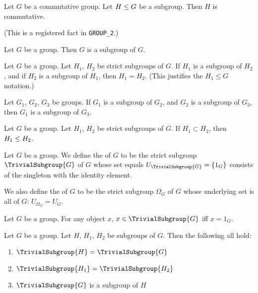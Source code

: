 \begin{theorem}
Let $G$ be a commutative group. Let $H\leq G$ be a subgroup.
Then $H$ is commutative.
\end{theorem}
(This is a registered fact in \texttt{GROUP\_2}.)

\begin{theorem}
Let $G$ be a group. Then $G$ is a subgroup of $G$.
\end{theorem}

\begin{theorem}
Let $G$ be a group.
Let $H_{1}$, $H_{2}$ be strict subgroups of $G$.
If $H_{1}$ is a subgroup of $H_{2}$, and if $H_{2}$ is a subgroup of $H_{1}$,
then $H_{1}=H_{2}$. (This justifies the $H_{1}\leq G$ notation.)
\end{theorem}

\begin{theorem}
Let $G_{1}$, $G_{2}$, $G_{3}$ be groups.
If $G_{1}$ is a subgroup of $G_{2}$, and $G_{2}$ is a subgroup of $G_{3}$,
then $G_{1}$ is a subgroup of $G_{3}$.
\end{theorem}

\begin{theorem}
Let $G$ be a group.
Let $H_{1}$, $H_{2}$ be strict subgroups of $G$.
If $H_{1}\subset H_{2}$, 
then $H_{1}\leq H_{2}$. 
\end{theorem}


\begin{definition}
Let $G$ be a group. We define the  of $G$ to be
the strict subgroup $\TrivialSubgroup{G}$ of $G$ whose set equals
$U_{\TrivialSubgroup{G}}=\{1_{G}\}$ consists of the singleton with the
identity element.

We also define the  of $G$ to be the
strict subgroup $\Omega_{G}$ of $G$ whose underlying set is all of
$G$: $U_{\Omega_{G}}=U_{G}$.
\end{definition}

\begin{theorem}
Let $G$ be a group. For any object $x$, $x\in\TrivialSubgroup{G}$ iff $x=1_{G}$.
\end{theorem}

\begin{theorem}
Let $G$ be a group. Let $H$, $H_{1}$, $H_{2}$ be subgroups of $G$.
Then the following all hold:
\begin{enumerate}
\item $\TrivialSubgroup{H}=\TrivialSubgroup{G}$
\item $\TrivialSubgroup{H_{1}}=\TrivialSubgroup{H_{2}}$
\item $\TrivialSubgroup{G}$ is a subgroup of $H$
\end{enumerate}
\end{theorem}

